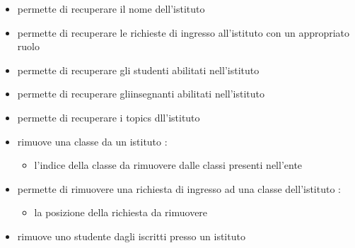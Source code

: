 \begin{itemize}
\newline
\item {}
\newline
permette di recuperare il nome dell'istituto
\newline
\item {}
\newline
permette di recuperare le richieste di ingresso all'istituto con un appropriato ruolo
\newline
\item {}
\newline
permette di recuperare gli studenti abilitati nell'istituto
\newline
\item {}
\newline
permette di recuperare gliinsegnanti abilitati nell'istituto
\newline
\item {}
\newline
permette di recuperare i topics dll'istituto
\newline
\item {}
\newline
rimuove una classe da un istituto
\newline
{} :
\begin{itemize}
\item {}
\newline
l'indice della classe da rimuovere dalle classi presenti nell'ente
\end{itemize}
\item {}
\newline
permette di rimuovere una richiesta di ingresso ad una classe dell'istituto
\newline
{} :
\begin{itemize}
\item {}
\newline
la posizione della richiesta da rimuovere
\end{itemize}
\item {}
\newline
rimuove uno studente dagli iscritti presso un istituto
\newline

\end{itemize}

